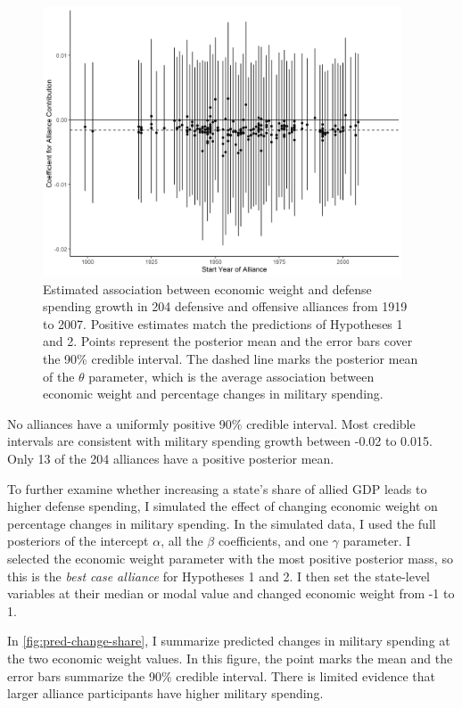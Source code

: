 \documentclass[12pt]{article}
\begin{document}
\begin{figure}[htbp]
	\centering
		\includegraphics[width=0.95\textwidth]{alliance-coefs-year.png}
	\caption{Estimated association between economic weight and defense spending growth in 204 defensive and offensive alliances from 1919 to 2007. Positive estimates match the predictions of Hypotheses 1 and 2. Points represent the posterior mean and the error bars cover the 90\% credible interval. The dashed line marks the posterior mean of the $\theta$ parameter, which is the average association between economic weight and percentage changes in military spending.}
	\label{fig:alliance-coefs-year}
\end{figure}


No alliances have a uniformly positive 90\% credible interval. 
Most credible intervals are consistent with military spending growth between -0.02 to 0.015. 
Only 13 of the 204 alliances have a positive posterior mean. 


To further examine whether increasing a state's share of allied GDP leads to higher defense spending, I simulated the effect of changing economic weight on percentage changes in military spending. 
In the simulated data, I used the full posteriors of the intercept $\alpha$, all the $\beta$ coefficients, and one $\gamma$ parameter. 
I selected the economic weight parameter with the most positive posterior mass, so this is the \emph{best case alliance} for Hypotheses 1 and 2. 
I then set the state-level variables at their median or modal value and changed economic weight from -1 to 1. 


In \autoref{fig:pred-change-share}, I summarize predicted changes in military spending at the two economic weight values. 
In this figure, the point marks the mean and the error bars summarize the 90\% credible interval. 
There is limited evidence that larger alliance participants have higher military spending. 
\end{document}
